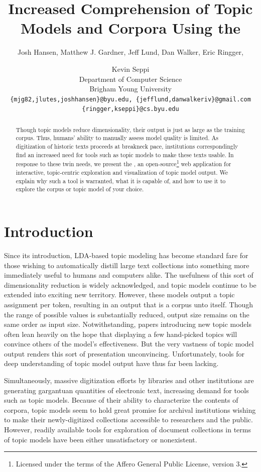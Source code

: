 \documentclass[11pt]{article}
\title{Increased Comprehension of Topic Models and Corpora Using the \tool}
\author{Josh Hansen, Matthew J. Gardner, Jeff Lund, Dan Walker, Eric Ringger, \and Kevin Seppi\\
Department of Computer Science\\
Brigham Young University\\
\tt \{mjg82,jlutes,joshhansen\}@byu.edu, \{jefflund,danwalkeriv\}@gmail.com\\
\tt \{ringger,kseppi\}@cs.byu.edu}
\begin{document}
\maketitle

\begin{abstract}
Though topic models reduce dimensionality, their output is just as large as the training corpus.
Thus, humans' ability to manually assess model quality is limited. As digitization of historic texts
proceeds at breakneck pace, institutions correspondingly find an increased need for tools such as
topic models to make these texts usable. In response to these twin needs, we present the \tool,
an open-source\footnote{Licensed under the terms of the
Affero General Public License, version 3.} web application for interactive, topic-centric
exploration and visualization of topic model output.
We explain why such a tool is warranted, what it is capable of, and
how to use it to explore the corpus or topic model of your choice.
\end{abstract}

\section{Introduction}
Since its introduction, LDA-based topic modeling \cite{blei_latent_2003} has
become standard fare for those wishing to automatically distill large text
collections into something more immediately useful to humans and computers
alike. The usefulness of this sort of dimensionality reduction is widely
acknowledged, and topic models continue to be extended into exciting new
territory.
\cite{wang_continuous_2008,mimno_polylingual_2009,boyd-graber_holistic_2010,brody_unsupervised_2010,he_detecting_2009,yao_efficient_2009}
However, these models output a topic assignment per token, resulting in an
output that is a corpus unto itself. Though the range of possible values is
substantially reduced, output size remains on the same order as input size.
Notwithstanding, papers introducing new topic models often lean heavily on the
hope that displaying a few hand-picked topics will convince others of the
model's effectiveness. But the very vastness of topic model output renders this
sort of presentation unconvincing. Unfortunately, tools for deep understanding
of topic model output have thus far been lacking.

Simultaneously, massive digitization efforts by libraries and other institutions
are generating gargantuan quantities of electronic text, increasing demand for tools such as
topic models. Because of their ability to characterize the contents of
corpora, topic models seem to hold great promise for archival
institutions wishing to make their newly-digitized collections accessible to
researchers and the public. However, readily available tools for exploration of 
document collections in terms of topic models have been either unsatisfactory
or nonexistent.
\end{document}
